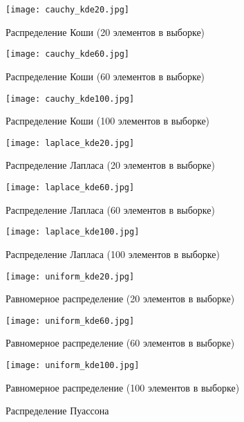\documentclass[main.tex]{subfiles}
\begin{document}
\begin{figure}[H]
	\centering \texttt{[image: cauchy\_kde20.jpg]}
	\caption{Распределение Коши (20 элементов в выборке)}
	\label{img:cauchy_kde20}
\end{figure}
\begin{figure}[H]
	\centering \texttt{[image: cauchy\_kde60.jpg]}
	\caption{Распределение Коши (60 элементов в выборке)}
	\label{img:cauchy_kde60}
\end{figure}
\begin{figure}[H]
	\centering \texttt{[image: cauchy\_kde100.jpg]}
	\caption{Распределение Коши (100 элементов в выборке)}
	\label{img:cauchy_kde100}
\end{figure}

\begin{figure}[H]
	\centering \texttt{[image: laplace\_kde20.jpg]}
	\caption{Распределение Лапласа (20 элементов в выборке)}
	\label{img:laplace_kde20}
\end{figure}
\begin{figure}[H]
	\centering \texttt{[image: laplace\_kde60.jpg]}
	\caption{Распределение Лапласа (60 элементов в выборке)}
	\label{img:laplace_kde60}
\end{figure}
\begin{figure}[H]
	\centering \texttt{[image: laplace\_kde100.jpg]}
	\caption{Распределение Лапласа (100 элементов в выборке)}
	\label{img:laplace_kde100}
\end{figure}

\begin{figure}[H]
	\centering \texttt{[image: uniform\_kde20.jpg]}
	\caption{Равномерное распределение (20 элементов в выборке)}
	\label{img:uniform_kde20}
\end{figure}
\begin{figure}[H]
	\centering \texttt{[image: uniform\_kde60.jpg]}
	\caption{Равномерное распределение (60 элементов в выборке)}
	\label{img:uniform_kde60}
\end{figure}
\begin{figure}[H]
	\centering \texttt{[image: uniform\_kde100.jpg]}
	\caption{Равномерное распределение (100 элементов в выборке)}
	\label{img:uniform_kde100}
\end{figure}

\begin{figure}[H]
	\caption{Распределение Пуассона}
	\label{img:poisson}
\end{figure}
	
\end{document}
